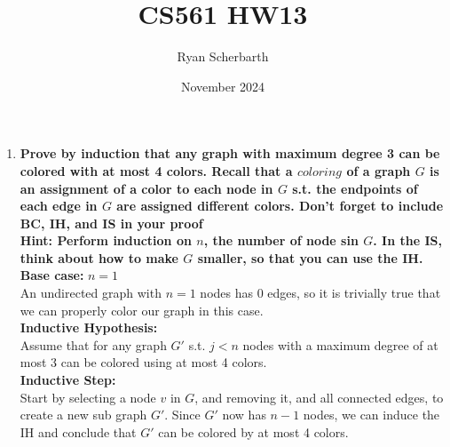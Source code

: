 \documentclass{article}
\title{CS561 HW13}
\author{Ryan Scherbarth}
\date{November 2024}
\begin{document}
\maketitle

\begin{enumerate}


\item \textbf{Prove by induction that any graph with maximum degree 3 can be colored with at most 4 colors. Recall that a $coloring$ of a graph $G$ is an assignment of a color to each node in $G$ s.t. the endpoints of each edge in $G$ are assigned different colors. Don't forget to include BC, IH, and IS in your proof} \\
\textbf{Hint: Perform induction on $n$, the number of node sin $G$. In the IS, think about how to make $G$ smaller, so that you can use the IH.} \\

\textbf{Base case: } $n=1$ \\
An undirected graph with $n=1$ nodes has 0 edges, so it is trivially true that we can properly color our graph in this case. \\

\textbf{Inductive Hypothesis: } \\
Assume that for any graph $G'$ s.t. $j < n$ nodes with a maximum degree of at most 3 can be colored using at most 4 colors. \\

\textbf{Inductive Step:} \\
Start by selecting a node $v$ in $G$, and removing it, and all connected edges, to create a new sub graph $G'$. Since $G'$ now has $n-1$ nodes, we can induce the IH and conclude that $G'$ can be colored by at most 4 colors. \\


\end{enumerate}
\end{document}
